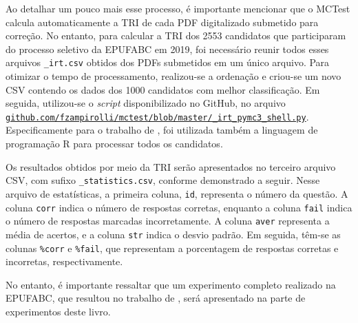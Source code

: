 Ao detalhar um pouco mais esse processo, é importante mencionar que o MCTest calcula automaticamente a TRI de cada PDF digitalizado submetido para correção. No entanto, para calcular a TRI dos 2553 candidatos que participaram do processo seletivo da EPUFABC em 2019, foi necessário reunir todos esses arquivos \verb|_irt.csv| obtidos dos PDFs submetidos em um único arquivo. Para otimizar o tempo de processamento, realizou-se a ordenação e criou-se um novo CSV contendo os dados dos 1000 candidatos com melhor classificação. Em seguida, utilizou-se o \textit{script} disponibilizado no GitHub, no arquivo \href{https://github.com/fzampirolli/mctest/blob/master/_irt_pymc3_shell.py}{\texttt{github.com/fzampirolli/mctest/blob/master/\_irt\_pymc3\_shell.py}}. Especificamente para o trabalho de , foi utilizada também a linguagem de programação R para processar todos os candidatos.




Os resultados obtidos por meio da TRI serão apresentados no terceiro arquivo CSV, com sufixo \verb|_statistics.csv|, conforme demonstrado a seguir. Nesse arquivo de estatísticas, a primeira coluna, \verb|id|, representa o número da questão. A coluna \verb|corr| indica o número de respostas corretas, enquanto a coluna \verb|fail| indica o número de respostas marcadas incorretamente. A coluna \verb|aver| representa a média de acertos, e a coluna \verb|str| indica o desvio padrão. Em seguida, têm-se as colunas \verb|%corr| e \verb|%fail|, que representam a porcentagem de respostas corretas e incorretas, respectivamente.

No entanto, é importante ressaltar que um experimento completo realizado na EPUFABC, que resultou no trabalho de , será apresentado na parte de experimentos deste livro.

